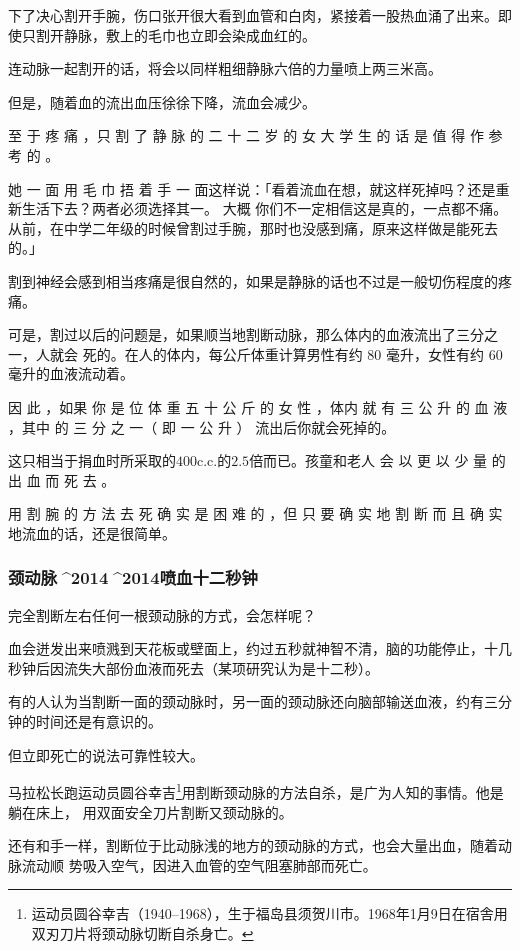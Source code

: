 \documentclass[UTF8]{ctexart}
\begin{document}
下了决心割开手腕，伤口张开很大看到血管和白肉，紧接着一股热血涌了出来。即使只割开静脉，敷上的毛巾也立即会染成血红的。

连动脉一起割开的话，将会以同样粗细静脉六倍的力量喷上两三米高。

但是，随着血的流出血压徐徐下降，流血会减少。 

至 于 疼 痛 ，只 割 了 静 脉 的 二 十 二 岁 的 女 大 学 生 的 话 是 值 得 作 参 考 的 。

她 一 面 用 毛 巾 捂 着 手 一 面这样说：「看着流血在想，就这样死掉吗？还是重新生活下去？两者必须选择其一。
大概 你们不一定相信这是真的，一点都不痛。从前，在中学二年级的时候曾割过手腕，那时也没感到痛，原来这样做是能死去的。」 

割到神经会感到相当疼痛是很自然的，如果是静脉的话也不过是一般切伤程度的疼痛。

可是，割过以后的问题是，如果顺当地割断动脉，那么体内的血液流出了三分之一，人就会 死的。在人的体内，每公斤体重计算男性有约 $80$ 毫升，女性有约 $60$ 毫升的血液流动着。

因 此 ，如果 你 是 位 体 重 五 十 公 斤 的 女 性 ，体内 就 有 三 公 升 的 血 液 ，其中 的 三 分 之 一（ 即 一 公 升 ） 流出后你就会死掉的。

这只相当于捐血时所采取的$400$c.c.的$2.5$倍而已。孩童和老人 会 以 更 以 少 量 的 出 血 而 死 去 。

用 割 腕 的 方 法 去 死 确 实 是 困 难 的 ，但 只 要 确 实 地 割 断 而 且 确 实 地流血的话，还是很简单。

\subsubsection{颈动脉^^^^2014^^^^2014喷血十二秒钟}

完全割断左右任何一根颈动脉的方式，会怎样呢？

血会迸发出来喷溅到天花板或壁面上，约过五秒就神智不清，脑的功能停止，十几秒钟后因流失大部份血液而死去（某项研究认为是十二秒）。

有的人认为当割断一面的颈动脉时，另一面的颈动脉还向脑部输送血液，约有三分钟的时间还是有意识的。

但立即死亡的说法可靠性较大。

马拉松长跑运动员圆谷幸吉\footnote{运动员圆谷幸吉（1940–1968），生于福岛县须贺川市。1968年1月9日在宿舎用双刃刀片将颈动脉切断自杀身亡。}用割断颈动脉的方法自杀，是广为人知的事情。他是躺在床上， 用双面安全刀片割断又颈动脉的。

还有和手一样，割断位于比动脉浅的地方的颈动脉的方式，也会大量出血，随着动脉流动顺 势吸入空气，因进入血管的空气阻塞肺部而死亡。
\end{document}
